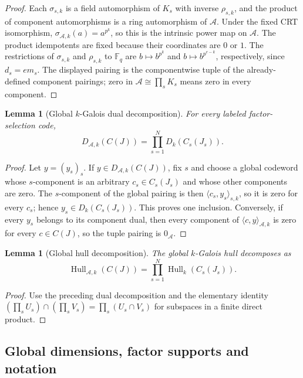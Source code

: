 \documentclass[10pt,a4paper]{article}
\newcommand{\F}{\mathbb F}
\newcommand{\A}{\mathcal A}
\newcommand{\Hull}{\operatorname{Hull}}
\newcommand{\Dk}{D_k}
\numberwithin{equation}{section}
\theoremstyle{plain}
\newtheorem{lemma}[theorem]{Lemma}
\theoremstyle{definition}
\theoremstyle{remark}
\begin{document}
\begin{proof}
Each $\sigma_{s,k}$ is a field automorphism of $K_s$ with inverse $\rho_{s,k}$,
and the product of component automorphisms is a ring automorphism of $\A$. Under
the fixed CRT isomorphism, $\sigma_{\A,k}(a)=a^{p^k}$, so this is the intrinsic
power map on $\A$. The product idempotents are fixed because their coordinates are
$0$ or $1$. The restrictions of $\sigma_{s,k}$ and $\rho_{s,k}$ to $\F_q$ are
$b\mapsto b^{p^k}$ and $b\mapsto b^{p^{e-k}}$, respectively, since $d_s=em_s$.
The displayed pairing is the componentwise tuple of the already-defined component
pairings; zero in $\A\cong\prod_sK_s$ means zero in every component.
\end{proof}

\begin{lemma}[Global $k$-Galois dual decomposition]\label{lem:global-dual}
For every labeled factor-selection code,
\[
D_{\A,k}(C(J))
 =\prod_{s=1}^{N}\Dk(C_s(J_s)).
\]
\end{lemma}

\begin{proof}
Let $y=(y_s)_s$. If $y\in D_{\A,k}(C(J))$, fix $s$ and choose a global codeword
whose $s$-component is an arbitrary $c_s\in C_s(J_s)$ and whose other components
are zero. The $s$-component of the global pairing is then
$\langle c_s,y_s\rangle_{s,k}$, so it is zero for every $c_s$; hence
$y_s\in \Dk(C_s(J_s))$. This proves one inclusion. Conversely, if every $y_s$
belongs to its component dual, then every component of
$\langle c,y\rangle_{\A,k}$ is zero for every $c\in C(J)$, so the tuple pairing
is $0_{\A}$.
\end{proof}

\begin{lemma}[Global hull decomposition]\label{lem:global-hull}
The global $k$-Galois hull decomposes as
\[
\Hull_{\A,k}(C(J))
 =\prod_{s=1}^{N}\Hull_k(C_s(J_s)).
\]
\end{lemma}

\begin{proof}
Use the preceding dual decomposition and the elementary identity
$(\prod_s U_s)\cap(\prod_s V_s)=\prod_s(U_s\cap V_s)$ for subspaces in a finite
direct product.
\end{proof}

\subsection{Global dimensions, factor supports and notation}\label{sec:dimensions}
\end{document}
